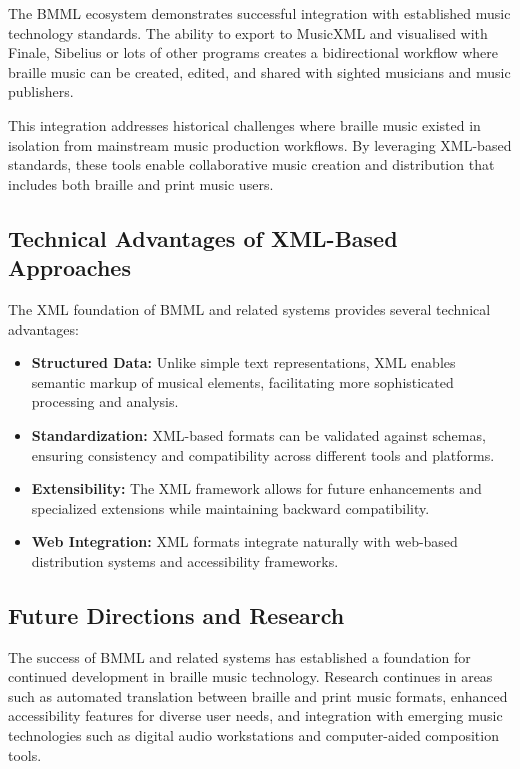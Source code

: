 The BMML ecosystem demonstrates successful integration with established music technology standards. The ability to export to MusicXML and visualised with Finale, Sibelius or lots of other programs creates a bidirectional workflow where braille music can be created, edited, and shared with sighted musicians and music publishers.

This integration addresses historical challenges where braille music existed in isolation from mainstream music production workflows. By leveraging XML-based standards, these tools enable collaborative music creation and distribution that includes both braille and print music users.

\subsection{Technical Advantages of XML-Based Approaches}

The XML foundation of BMML and related systems provides several technical advantages:

\begin{itemize}
    \item \textbf{Structured Data:} Unlike simple text representations, XML enables semantic markup of musical elements, facilitating more sophisticated processing and analysis.
    \item \textbf{Standardization:} XML-based formats can be validated against schemas, ensuring consistency and compatibility across different tools and platforms.
    \item \textbf{Extensibility:} The XML framework allows for future enhancements and specialized extensions while maintaining backward compatibility.
    \item \textbf{Web Integration:} XML formats integrate naturally with web-based distribution systems and accessibility frameworks.
\end{itemize}

\subsection{Future Directions and Research}

The success of BMML and related systems has established a foundation for continued development in braille music technology. Research continues in areas such as automated translation between braille and print music formats, enhanced accessibility features for diverse user needs, and integration with emerging music technologies such as digital audio workstations and computer-aided composition tools.

